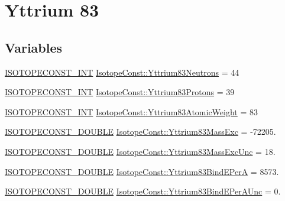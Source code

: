 \hypertarget{group___isotope_const-_yttrium-_y83}{}\section{Yttrium 83}
\label{group___isotope_const-_yttrium-_y83}
\subsection*{Variables}
\begin{DoxyCompactItemize}
\item 
\mbox{\hyperlink{group___isotope_const-_macros_ga5f18360b3e99483a35c32d789e62621c}{I\+S\+O\+T\+O\+P\+E\+C\+O\+N\+S\+T\+\_\+\+I\+NT}} \mbox{\hyperlink{group___isotope_const-_yttrium-_y83_ga3cf5ce68a7fac6a28c3dfaef41f5d0b7}{Isotope\+Const\+::\+Yttrium83\+Neutrons}} = 44
\item 
\mbox{\hyperlink{group___isotope_const-_macros_ga5f18360b3e99483a35c32d789e62621c}{I\+S\+O\+T\+O\+P\+E\+C\+O\+N\+S\+T\+\_\+\+I\+NT}} \mbox{\hyperlink{group___isotope_const-_yttrium-_y83_ga57a928c5e91f48bf6c6fc438f7413bc6}{Isotope\+Const\+::\+Yttrium83\+Protons}} = 39
\item 
\mbox{\hyperlink{group___isotope_const-_macros_ga5f18360b3e99483a35c32d789e62621c}{I\+S\+O\+T\+O\+P\+E\+C\+O\+N\+S\+T\+\_\+\+I\+NT}} \mbox{\hyperlink{group___isotope_const-_yttrium-_y83_gafb27dd38426e24b6e2373e93b2f5ba0a}{Isotope\+Const\+::\+Yttrium83\+Atomic\+Weight}} = 83
\item 
\mbox{\hyperlink{group___isotope_const-_macros_ga8f45a7272ce02c0b4c65c44636ed719a}{I\+S\+O\+T\+O\+P\+E\+C\+O\+N\+S\+T\+\_\+\+D\+O\+U\+B\+LE}} \mbox{\hyperlink{group___isotope_const-_yttrium-_y83_gad1478f28c5b78687b864645072ab4b25}{Isotope\+Const\+::\+Yttrium83\+Mass\+Exc}} = -\/72205.
\item 
\mbox{\hyperlink{group___isotope_const-_macros_ga8f45a7272ce02c0b4c65c44636ed719a}{I\+S\+O\+T\+O\+P\+E\+C\+O\+N\+S\+T\+\_\+\+D\+O\+U\+B\+LE}} \mbox{\hyperlink{group___isotope_const-_yttrium-_y83_ga738fd0c9d19aeaddffccf60985d93a9c}{Isotope\+Const\+::\+Yttrium83\+Mass\+Exc\+Unc}} = 18.
\item 
\mbox{\hyperlink{group___isotope_const-_macros_ga8f45a7272ce02c0b4c65c44636ed719a}{I\+S\+O\+T\+O\+P\+E\+C\+O\+N\+S\+T\+\_\+\+D\+O\+U\+B\+LE}} \mbox{\hyperlink{group___isotope_const-_yttrium-_y83_ga58c0026c2203873bb6f074f34226dc3e}{Isotope\+Const\+::\+Yttrium83\+Bind\+E\+PerA}} = 8573.
\item 
\mbox{\hyperlink{group___isotope_const-_macros_ga8f45a7272ce02c0b4c65c44636ed719a}{I\+S\+O\+T\+O\+P\+E\+C\+O\+N\+S\+T\+\_\+\+D\+O\+U\+B\+LE}} \mbox{\hyperlink{group___isotope_const-_yttrium-_y83_ga35765208cefefc837561a2aa9d83c315}{Isotope\+Const\+::\+Yttrium83\+Bind\+E\+Per\+A\+Unc}} = 0.

\end{DoxyCompactItemize}
